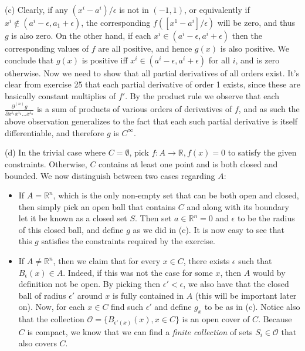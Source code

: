 \begin{solution}
    (c)  Clearly, if any $(x^i - a^i)/\epsilon$ is not in $(-1, 1)$, or equivalently if $x^i \notin (a^i - \epsilon, a_1 + \epsilon)$, the corresponding $f([x^1 - a^i]/\epsilon)$ will be zero, and thus $g$ is also zero.
    On the other hand, if each $x^i \in (a^i - \epsilon, a^i + \epsilon)$ then the corresponding values of $f$ are all positive, and hence $g(x)$ is also positive.
    We conclude that $g(x)$ is positive iff $x^i \in (a^i - \epsilon, a^i + \epsilon)$ for all $i$, and is zero otherwise.
    Now we need to show that all partial derivatives of all orders exist.
    It's clear from exercise 25 that each partial derivative of order 1 exists, since these are basically constant multiplies of $f'$.
    By the product rule we observe that each $\frac{\partial^{(n)} g}{\partial x^{i_1}x^{i_2}\ldots x^{i_n}}$ is a sum of products of various orders of derivatives of $f$, and as such the above observation generalizes to the fact that each such partial derivative is itself differentiable, and therefore $g$ is $C^\infty$.

    (d) In the trivial case where $C = \emptyset$, pick $f: A \rightarrow \mathbb{R}, f(x) = 0$ to satisfy the given constraints.
    Otherwise, $C$ contains at least one point and is both closed and bounded.
    We now distinguish between two cases regarding $A$:
    \begin{itemize}
        \item If $A = \mathbb{R}^n$, which is the only non-empty set that can be both open and closed, then simply pick an open ball that contains $C$ and along with its boundary let it be known as a closed set $S$. Then set $a \in \mathbb{R}^n = 0$ and $\epsilon$ to be the radius of this closed ball, and define $g$ as we did in (c).
        It is now easy to see that this $g$ satisfies the constraints required by the exercise.
        \item If $A \neq \mathbb{R}^n$, then we claim that for every $x \in C$, there exists $\epsilon$ such that $B_\epsilon(x) \in A$.
        Indeed, if this was not the case for some $x$, then $A$ would by definition not be open.
        By picking then $\epsilon' < \epsilon$, we also have that the closed ball of radius $\epsilon'$ around $x$ is fully contained in $A$ (this will be important later on).
        Now, for each $x \in C$ find such $\epsilon'$ and define $g_x$ to be as in (c).
        Notice also that the collection $\mathcal{O} = \{B_{\epsilon'(x)}(x), x \in C\}$ is an open cover of $C$.
        Because $C$ is compact, we know that we can find a \textit{finite collection} of sets $S_i \in \mathcal{O}$ that also covers $C$.
        

\end{itemize}
\end{solution}
